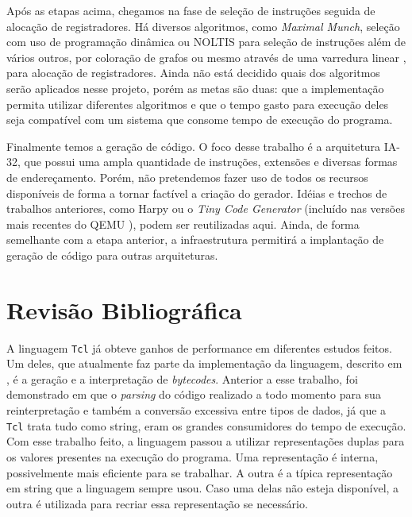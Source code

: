 Após as etapas acima, chegamos na fase de seleção de instruções
seguida de alocação de registradores. Há diversos algoritmos, como
\textit{Maximal Munch}, seleção com uso de programação dinâmica ou
NOLTIS \cite{noltis}  para seleção de instruções além de vários
outros, por coloração de grafos ou mesmo através de uma varredura
linear \cite{linear_scan_regalloc}, para alocação de registradores.
Ainda não está decidido quais dos algoritmos serão aplicados nesse
projeto, porém as metas são duas: que a implementação permita utilizar
diferentes algoritmos e que o tempo gasto para execução deles
seja compatível com um sistema que consome tempo de execução do programa.

Finalmente temos a geração de código. O foco desse trabalho é a
arquitetura IA-32, que possui uma ampla quantidade de instruções, extensões e
diversas formas de endereçamento.
Porém, não pretendemos fazer uso de todos os recursos disponíveis de
forma a tornar factível a criação do gerador.
Idéias e trechos de trabalhos anteriores, como Harpy \cite{harpy}
ou o \textit{Tiny Code Generator} (incluído nas versões mais recentes do
QEMU \cite{qemu}), podem ser reutilizadas aqui.
Ainda, de forma semelhante com a etapa anterior, a infraestrutura
permitirá a implantação de geração de código para outras arquiteturas.


\section{Revisão Bibliográfica}

A linguagem \texttt{Tcl} já obteve ganhos de performance em diferentes
estudos feitos. Um deles, que atualmente faz parte da implementação da
linguagem, descrito em \cite{tcl_bytecode}, é a geração e a
interpretação de \textit{bytecodes}. Anterior a esse trabalho, foi
demonstrado em \cite{sah_tc} que o \textit{parsing} do código
realizado a todo momento para sua reinterpretação e também a conversão
excessiva entre tipos de dados, já que a \texttt{Tcl} trata tudo como string,
eram os grandes consumidores do tempo de execução. Com esse trabalho
feito, a linguagem passou a utilizar representações duplas para os
valores presentes na execução do programa. Uma representação é
interna, possivelmente mais eficiente para se trabalhar. A outra é a
típica representação em string que a linguagem sempre usou. Caso uma
delas não esteja disponível, a outra é utilizada para recriar essa
representação se necessário.

